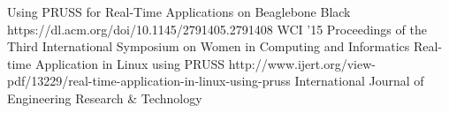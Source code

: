 %
%
%


\begin{publications}
    \publication
        {Using PRUSS for Real-Time Applications on Beaglebone Black}
        {https://dl.acm.org/doi/10.1145/2791405.2791408}
        {WCI '15 Proceedings of the Third International Symposium on Women in Computing and Informatics}
        \newline
        \newline
    \publication
        {Real-time Application in Linux using PRUSS}
        {http://www.ijert.org/view-pdf/13229/real-time-application-in-linux-using-pruss}
        {International Journal of Engineering Research & Technology}
        \newline
        \newline
\end{publications}